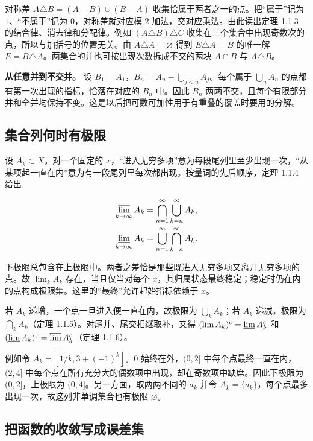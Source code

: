 \documentclass[11pt,a4paper]{article}
\begin{document}
对称差 \(A\triangle B=(A-B)\cup(B-A)\) 收集恰属于两者之一的点。把``属于''记为 \(1\)、``不属于''记为 \(0\)，对称差就对应模 \(2\) 加法，交对应乘法。由此读出定理 1.1.3 的结合律、消去律和分配律。例如 \((A\triangle B)\triangle C\) 收集在三个集合中出现奇数次的点，所以与加括号的位置无关。由 \(A\triangle A=\varnothing\) 得到 \(E\triangle A=B\) 的唯一解 \(E=B\triangle A\)。两集合的并也可按出现次数拆成不交的两块 \(A\cap B\) 与 \(A\triangle B\)。

\textbf{从任意并到不交并。} 设 \(B_1=A_1\)，\(B_n=A_n-\bigcup_{j<n}A_j\)。每个属于 \(\bigcup_n A_n\) 的点都有第一次出现的指标，恰落在对应的 \(B_n\) 中。因此 \(B_n\) 两两不交，且每个有限部分并和全并均保持不变。这是以后把可数可加性用于有重叠的覆盖时要用的分解。

\subsection{集合列何时有极限}

设 \(A_k\subset X\)。对一个固定的 \(x\)，``进入无穷多项''意为每段尾列里至少出现一次，``从某项起一直在内''意为有一段尾列里每次都出现。按量词的先后顺序，定理 1.1.4 给出

\[
\begin{aligned}
\varlimsup_{k\to\infty}A_k&=\bigcap_{n=1}^{\infty}\bigcup_{k=n}^{\infty}A_k,\\
\varliminf_{k\to\infty}A_k&=\bigcup_{n=1}^{\infty}\bigcap_{k=n}^{\infty}A_k .
\end{aligned}
\]

下极限总包含在上极限中。两者之差恰是那些既进入无穷多项又离开无穷多项的点。故 \(\lim_k A_k\) 存在，当且仅当对每个 \(x\)，其归属状态最终稳定；稳定时仍在内的点构成极限集。这里的``最终''允许起始指标依赖于 \(x\)。

若 \(A_k\) 递增，一个点一旦进入便一直在内，故极限为 \(\bigcup_k A_k\)；若 \(A_k\) 递减，极限为 \(\bigcap_k A_k\)（定理 1.1.5）。对尾并、尾交相继取补，又得 \((\varlimsup A_k)^c=\varliminf A_k^c\) 和 \((\varliminf A_k)^c=\varlimsup A_k^c\)（定理 1.1.6）。

例如令 \(A_k=[1/k,3+(-1)^k]\)。\(0\) 始终在外，\((0,2]\) 中每个点最终一直在内，\((2,4]\) 中每个点在所有充分大的偶数项中出现，却在奇数项中缺席。因此下极限为 \((0,2]\)，上极限为 \((0,4]\)。另一方面，取两两不同的 \(a_k\) 并令 \(A_k=\{a_k\}\)，每个点最多出现一次，故这列非单调集合也有极限 \(\varnothing\)。

\subsection{把函数的收敛写成误差集}
\end{document}
